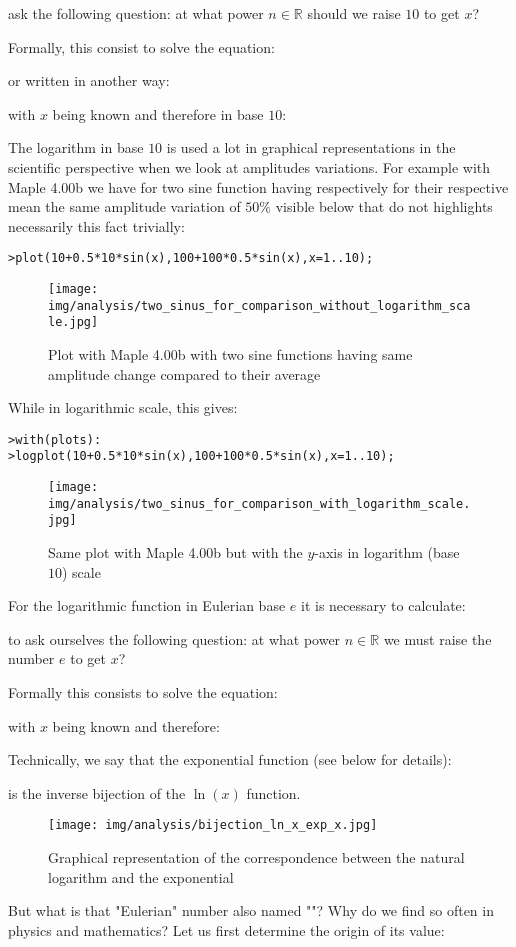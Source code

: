 	ask the following question: at what power $n\in \mathbb{R}$ should we raise $10$ to get $x$?
	
	Formally, this consist to solve the equation:
	
	or written in another way:
	
	with $x$ being known and therefore in base $10$:
	
	The logarithm in base $10$ is used a lot in graphical representations in the scientific perspective when we look at amplitudes variations. For example with Maple 4.00b  we have for two sine function  having respectively for their respective mean the same amplitude variation of $50\%$ visible below that do not highlights necessarily this fact trivially:
	
	\texttt{>plot({10+0.5*10*sin(x),100+100*0.5*sin(x)},x=1..10);}
	
	\begin{figure}[H]
		\centering
		\texttt{[image: img/analysis/two\_sinus\_for\_comparison\_without\_logarithm\_scale.jpg]}
		\caption[]{Plot with Maple 4.00b with two sine functions having same amplitude change compared to their average}
	\end{figure}
	While in logarithmic scale, this gives:
	
	\texttt{>with(plots):\\
	>logplot({10+0.5*10*sin(x),100+100*0.5*sin(x)},x=1..10);}
	
	\begin{figure}[H]
		\centering
		\texttt{[image: img/analysis/two\_sinus\_for\_comparison\_with\_logarithm\_scale.jpg]}
		\caption[]{Same plot with Maple 4.00b but with the $y$-axis in logarithm (base $10$) scale}
	\end{figure}
	For the logarithmic function in Eulerian base $e$ it is necessary to calculate:
	
	to ask ourselves the following question: at what power $n\in \mathbb{R}$ we must raise the number $e$ to get $x$?
	
	Formally this consists to solve the equation:
	
	with $x$ being known and therefore:
	
	Technically, we say that the exponential function (see below for details):
	
	is the inverse bijection of the $\ln (x)$ function.
	\begin{figure}[H]
		\centering
		\texttt{[image: img/analysis/bijection\_ln\_x\_exp\_x.jpg]}
		\caption{Graphical representation of the correspondence between the natural logarithm and the exponential}
	\end{figure}
	But what is that "Eulerian" number also named "\label{Euler number}"? Why do we find so often in physics and mathematics? Let us first determine the origin of its value:
	
